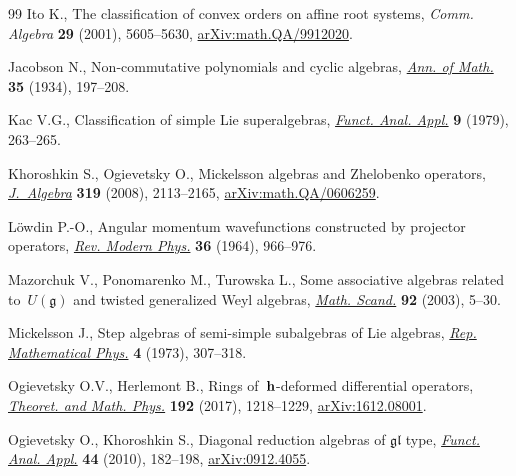 \begin{thebibliography}{99}
Ito K., The classification of convex orders on affine root systems,
\textit{Comm. Algebra} \textbf{29} (2001), 5605--5630,
 \href{https://arxiv.org/abs/math.QA/9912020}{arXiv:math.QA/9912020}.

Jacobson N., Non-commutative polynomials and cyclic algebras, \href{https://doi.org/10.2307/1968424}{\textit{Ann. of
 Math.}} \textbf{35} (1934), 197--208.

Kac V.G., Classification of simple {L}ie superalgebras, \href{https://doi.org/10.1007/BF01075610}{\textit{Funct. Anal.
 Appl.}} \textbf{9} (1979), 263--265.

Khoroshkin S., Ogievetsky O., Mickelsson algebras and {Z}helobenko operators,
 \href{https://doi.org/10.1016/j.jalgebra.2007.04.020}{\textit{J.~Algebra}} \textbf{319} (2008), 2113--2165,
 \href{https://arxiv.org/abs/math.QA/0606259}{arXiv:math.QA/0606259}.


L\"owdin P.-O., Angular momentum wavefunctions constructed by projector
 operators, \href{https://doi.org/10.1103/RevModPhys.36.966}{\textit{Rev. Modern Phys.}} \textbf{36} (1964), 966--976.

Mazorchuk V., Ponomarenko M., Turowska L., Some associative algebras related
 to~{$U(\mathfrak g)$} and twisted generalized {W}eyl algebras, \href{https://doi.org/10.7146/math.scand.a-14392}{\textit{Math.
 Scand.}} \textbf{92} (2003), 5--30.

Mickelsson J., Step algebras of semi-simple subalgebras of {L}ie algebras,
 \href{https://doi.org/10.1016/0034-4877(73)90006-2}{\textit{Rep. Mathematical Phys.}} \textbf{4} (1973), 307--318.

Ogievetsky O.V., Herlemont B., Rings of~{$\bf h$}-deformed differential
 operators, \href{https://doi.org/10.1134/S0040577917080104}{\textit{Theoret. and Math. Phys.}} \textbf{192} (2017), 1218--1229,
 \href{https://arxiv.org/abs/1612.08001}{arXiv:1612.08001}.

 Ogievetsky O., Khoroshkin S., Diagonal reduction algebras of $\mathfrak{gl}$
 type, \href{https://doi.org/10.1007/s10688-010-0023-0}{\textit{Funct. Anal. Appl.}} \textbf{44} (2010), 182--198,
 \href{https://arxiv.org/abs/0912.4055}{arXiv:0912.4055}.


\end{thebibliography}
